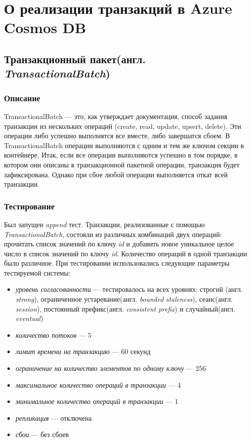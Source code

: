 \documentclass[12pt,  openany]{book}
\begin{document}
\section{О реализации транзакций в Azure Cosmos DB}
\subsection{Транзакционный пакет(англ. \textit{TransactionalBatch})}
\subsubsection{Описание}
TransactionalBatch --- это, как утверждает документация, способ задания транзакции из нескольких операций (create, read, update, upsert, delete). Эти операции либо успешно выполнятся все вместе, либо завершатся сбоем.  В TransactionalBatch операции выполняются с одним и тем же ключом секции в контейнере.  Итак, если все операции выполняются успешно в том порядке, в котором они описаны в транзакционной пакетной операции, транзакция будет зафиксирована. Однако при сбое любой операции выполняется откат всей транзакции. 

\subsubsection{Тестирование}
Был запущен \textit{append} тест. \newline
Транзакции,  реализованные с помощью \textit{TransactionalBatch},  состояли из различных комбинаций двух операций: прочитать список значений по ключу \textit{id} и добавить новое уникальное целое число в список значений по ключу \textit{id}. Количество операций в одной транзакции было различное.
При тестировании использовались следующие параметры тестируемой системы:
\begin{itemize}
\item[] \textit{уровень согласованности} --- тестировалось на всех уровнях: строгий (англ.  \textit{strong}), ограниченное устаревание(англ.  \textit{bounded staleness}), сеанс(англ.  \textit{session}), постоянный префикс(англ.  \textit{consistent prefix}) и случайный(англ.  \textit{eventual})
\item[] \textit{количество потоков} --- 5
\item[] \textit{лимит времени на транзакцию} --- 60 секунд
\item[] \textit{ограничение на количество элементов по одному ключу} --- 256
\item[] \textit{максимальное количество операций в транзакции} --- 4
\item[] \textit{минимальное количество операций в транзакции} --- 1
\item[] \textit{репликация} --- отключена
\item[] \textit{сбои} --- без сбоев
\end{itemize}
\end{document}

